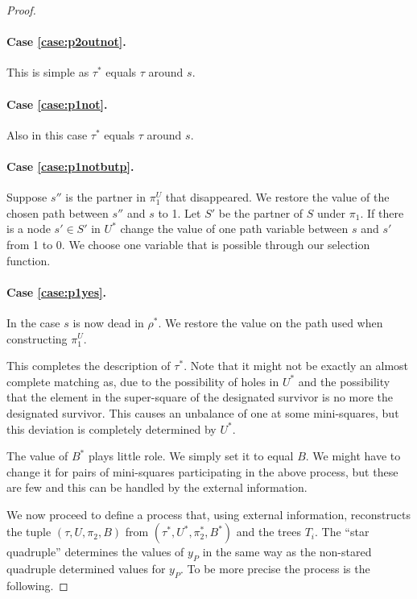 \documentclass{article}\usepackage[a4paper,margin=20mm]{geometry}
\begin{document}
\begin{proof}
\paragraph{Case \ref{case:p2outnot}.}  This is simple as $\tau^*$
equals $\tau$ around $s$.

\paragraph{Case \ref{case:p1not}.}  Also in this case $\tau^*$
equals $\tau$ around $s$.

\paragraph{Case \ref{case:p1notbutp}.}  Suppose $s''$
is the partner in $\pi_1^U$ that disappeared.
We restore the value of the chosen path
between $s''$ and $s$ to 1.  Let $S'$ be
the partner of $S$ under $\pi_1$.  
If there is a node $s' \in S'$ in $U^*$
change the value of one path variable between $s$ and $s'$
from 1 to 0.  We choose one variable that is possible
through our selection function.

\paragraph{Case \ref{case:p1yes}.}
In the case $s$ is now dead in $\rho^*$. We restore
the value on the path used when constructing $\pi_1^U$.

This completes the description of $\tau^*$.  Note that
it might not be exactly an almost complete matching as, due
to the possibility of holes in $U^*$ and the possibility that
the element in the super-square of the designated survivor
is no more the designated survivor.
This causes an unbalance of one at some mini-squares,
but this deviation is completely determined by $U^*$.

The value of $B^*$  plays little role.  We simply set it
to equal $B$.  We might have to change it for 
pairs of mini-squares participating in the above
process, but these are few and this can be handled
by the external information.

We now proceed to define a process that, using external information,
reconstructs the tuple $(\tau, U, \pi_2, B)$ from
$(\tau^*, U^*, \pi_2^*, B^*)$ and the trees $T_i$.
The ``star quadruple'' determines the values of
$y_P$ in the same way as the non-stared
quadruple determined values for $y_P$.  To be more
precise the process is the following.


\end{proof}
\end{document}
